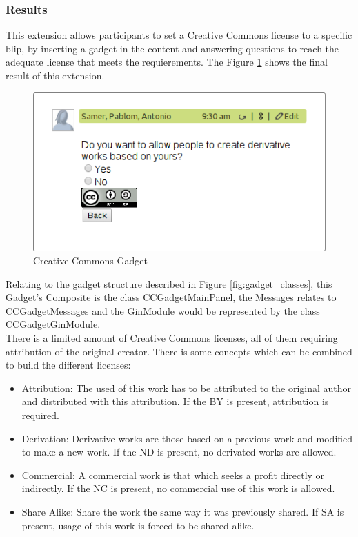 \subsubsection{Results}
This extension allows participants to set a Creative Commons license to a specific blip, by inserting a gadget in the content and answering questions to reach the adequate license that meets the requierements. The Figure \ref{fig:cc_gadget} shows the final result of this extension.
\begin{figure}[h]
  \center
    \includegraphics[keepaspectratio, scale=0.7]{Media/Captures/Extensions/CCGadget.png}
  \caption{Creative Commons Gadget}
  \label{fig:cc_gadget}
\end{figure}
Relating to the gadget structure described in Figure \ref{fig:gadget_classes}, this Gadget's Composite is the class CCGadgetMainPanel, the Messages relates to CCGadgetMessages and the GinModule would be represented by the class CCGadgetGinModule.\\[.2cm]
There is a limited amount of Creative Commons licenses, all of them requiring attribution of the original creator. There is some concepts which can be combined to build the different licenses:
\begin{itemize}
  \item Attribution: The used of this work has to be attributed to the original author and distributed with this attribution. If the BY is present, attribution is required.
  \item Derivation: Derivative works are those based on a previous work and modified to make a new work. If the ND is present, no derivated works are allowed.
  \item Commercial: A commercial work is that which seeks a profit directly or indirectly. If the NC is present, no commercial use of this work is allowed.
  \item Share Alike: Share the work the same way it was previously shared. If SA is present, usage of this work is forced to be shared alike.
\end{itemize}
